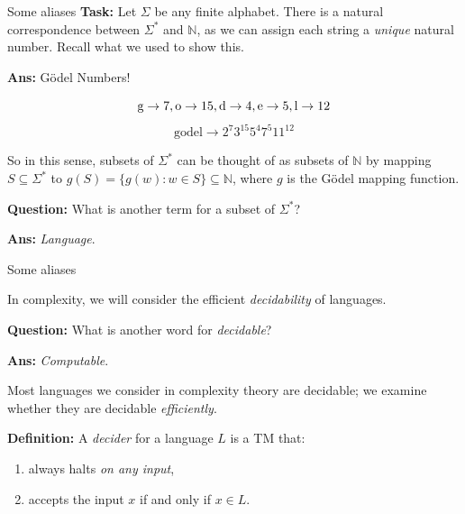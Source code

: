 \documentclass{beamer}
\newcommand{\N}{{\mathbb N}}
\begin{document}
\begin{frame}{Some aliases}
\textbf{Task:} Let $\Sigma$ be any finite alphabet. There is a natural correspondence between $\Sigma^*$ and $\N$, as we can assign each string a \textit{unique} natural number. Recall what we used to show this.

\vspace{2mm} \pause

\textbf{Ans:} G\"odel Numbers!

$$\text g \rightarrow 7, \text o \rightarrow 15, \text d \rightarrow 4, \text e \rightarrow 5, \text l \rightarrow 12$$
$$\text{godel} \rightarrow 2^7 3^{15} 5^{4} 7^{5} 11^{12}$$

\vspace{4mm}

So in this sense, subsets of $\Sigma^*$ can be thought of as subsets of $\N$ by mapping $S \subseteq \Sigma^*$ to $g(S) = \{g(w): w \in S\} \subseteq \N$, where $g$ is the G\"odel mapping function.

\vspace{2mm} \pause

\textbf{Question:} What is another term for a subset of $\Sigma^*$?

\pause

\textbf{Ans:} \textit{Language}.

\vspace{2mm}


\end{frame}

\begin{frame}{Some aliases}

In complexity, we will consider the efficient \textit{decidability} of languages.

\vspace{2mm}

\textbf{Question:} What is another word for \textit{decidable}?

\pause

\textbf{Ans:} \textit{Computable}.

\vspace{2mm}

Most languages we consider in complexity theory are decidable; we examine whether they are decidable \textit{efficiently}.

\vspace{2mm} \pause

\textbf{Definition:} A \textit{decider} for a language $L$ is a TM that: 
\begin{enumerate}
    \item always halts \textit{on any input},
    \item accepts the input $x$ if and only if $x \in L$.
\end{enumerate}

\end{frame}
\end{document}
